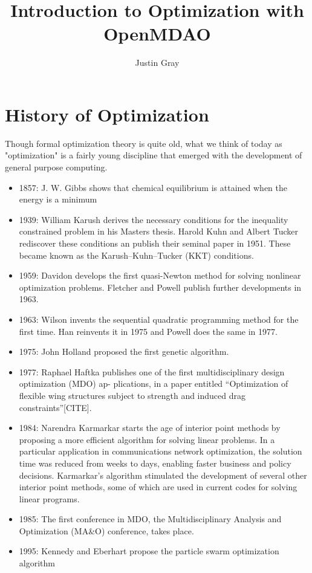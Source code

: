 \documentclass[conf]{new-aiaa}
\begin{document}
\title{Introduction to Optimization with OpenMDAO}
\author{Justin Gray}

\maketitle

\section{History of Optimization}


\noindent Though formal optimization theory is quite old, what we think of today as "optimization" is a fairly young discipline that emerged with the development of general purpose computing. 

    \begin{itemize}[itemsep=1.2em, label={}, itemindent=-3em]
        \item 1857: J. W. Gibbs shows that chemical equilibrium is attained when the energy is a minimum
        \item 1939: William Karush derives the necessary conditions for the inequality constrained problem in his Masters thesis. Harold Kuhn and Albert Tucker rediscover these conditions an publish their seminal  
            paper in 1951. These became known as the Karush–Kuhn–Tucker (KKT) conditions.
        \item 1959: Davidon develops the first quasi-Newton method for solving nonlinear optimization problems. Fletcher and Powell publish further developments in 1963.
        \item 1963: Wilson invents the sequential quadratic programming method for the first time. Han reinvents it in 1975 and Powell does the same in 1977.
        \item 1975: John Holland proposed the first genetic algorithm.
        \item 1977: Raphael Haftka publishes one of the first multidisciplinary design optimization (MDO) ap- plications, 
                in a paper entitled “Optimization of flexible wing structures subject to strength and induced drag constraints”[CITE].
        \item 1984: Narendra Karmarkar starts the age of interior point methods by proposing a more efficient algorithm for solving linear problems. In a particular application in communications network optimization, the solution time was reduced from weeks to days, enabling faster business and policy decisions. Karmarkar’s algorithm stimulated the development of several other interior point methods, some of which are used in current codes for solving linear programs.
        \item 1985: The first conference in MDO, the Multidisciplinary Analysis and Optimization (MA\&O) conference, takes place.
        \item 1995: Kennedy and Eberhart propose the particle swarm optimization algorithm
    \end{itemize}
\end{document}
